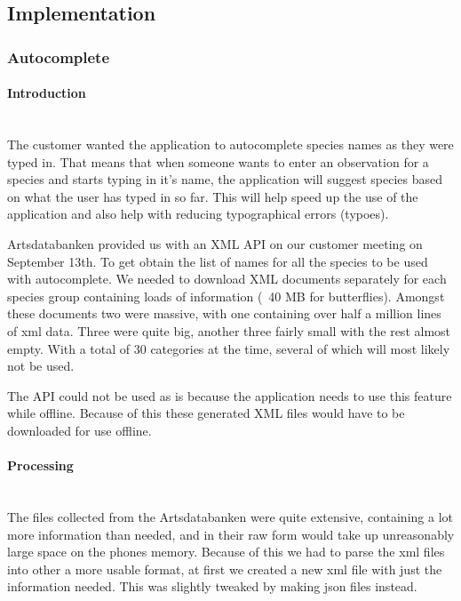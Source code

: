 \subsection{Implementation}

\subsubsection{Autocomplete}

	\paragraph{Introduction} \hspace{1mm}\\
	The customer wanted the application to autocomplete species names as they were typed in. 
	That means that when someone wants to enter an observation for a species and starts typing in it's name, the application will suggest species based on what the user has typed in so far. 
	This will help speed up the use of the application and also help with reducing typographical errors (typoes).

	Artsdatabanken provided us with an XML API on our customer meeting on September 13th. 
	To get obtain the list of names for all the species to be used with autocomplete. 
	We needed to download XML documents separately for each species group containing loads of information (~40 MB for butterflies).
	Amongst these documents two were massive, with one containing over half a million lines of xml data. 
	Three were quite big, another three fairly small with the rest almost empty. With a total of 30 categories at the time, several of which will most likely not be used.

	The API could not be used as is because the application needs to use this feature while offline. Because of this these generated XML files would have to be downloaded for use offline.

	\paragraph{Processing}  \hspace{1mm}\\
	The files collected from the Artsdatabanken were quite extensive, containing a lot more information than needed, and in their raw form would take up unreasonably large space on the phones memory. 
	Because of this we had to parse the xml files into other a more usable format, at first we created a new xml file with just the information needed. 
	This was slightly tweaked by making json files instead.

